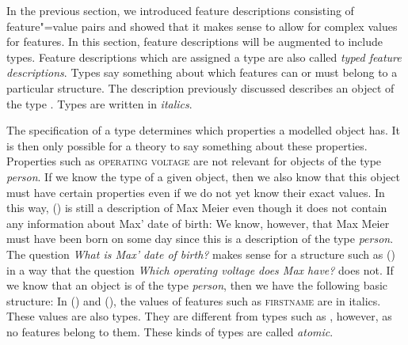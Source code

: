 In the previous section, we introduced feature descriptions consisting of feature"=value pairs and showed that it makes sense to allow for
complex values for features. In this section, feature descriptions will be augmented to include types. Feature descriptions which are assigned a type
are also called \emph{typed feature descriptions}. Types say something about which features can or must belong to a 
particular structure. The description previously discussed describes an object of the type .
\ea
{}
\z
Types are written in \textit{italics}. 

The specification of a type determines which properties a modelled object has. It is then only
possible for a theory to say something about these properties.
Properties such as \textsc{operating voltage} are not relevant for objects of the type \textit{person}. If we know the type of a given object, then we
also know that this object must have certain properties even if we do not yet know their exact values. In this way, () is still a description of
Max Meier even though it does not contain any information about Max' date of birth:
\ea
{}
\z
We know, however, that Max Meier must have been born on some day since this is a description of the type \textit{person}.
The question \emph{What is Max' date of birth?} makes sense for a structure such as () in a way that the question
\emph{Which operating voltage does Max have?} does not. If we know that an object is of the type \textit{person}, then we have
the following basic structure:
\ea
{}
\z
In () and (), the values of features such as \textsc{firstname} are in italics. These values are also types. They are different from
types such as , however, as no features belong to them. These kinds of types are called \emph{atomic}.


